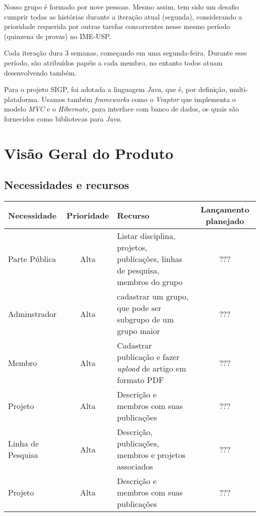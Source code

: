\documentclass[11pt, a4paper]{article}
\begin{document}
Nosso grupo é formado por nove pessoas. Mesmo assim, tem sido um desafio cumprir todas as histórias durante a iteração atual (segunda), considerando a prioridade requerida por outras tarefas concorrentes nesse mesmo período (quinzena de provas) no IME-USP. 

 Cada iteração dura 3 semanas, começando em uma segunda-feira. Durante esse período, são atribuídos papéis a cada membro, no entanto todos atuam desenvolvendo também.

Para o projeto SIGP, foi adotada a linguagem \emph{Java}, que é, por definição, multi-plataforma. Usamos também \emph{frameworks} como o \emph{Vraptor} que implementa o modelo \emph{MVC} e o \emph{Hibernate}, para interface com banco de dados, os quais são fornecidos como bibliotecas para \emph{Java}.
    
    \section{Visão Geral do Produto}
        \subsection{Necessidades e recursos}
            \begin{tabular}{| l | c | p{5cm} | c |}
                \hline
                Necessidade & Prioridade & Recurso & Lançamento planejado \\ \hline
                Parte Pública & Alta & Listar disciplina, projetos, publicações, linhas de pesquisa, membros do grupo & ???\\ \hline
                Adminstrador & Alta & cadastrar um grupo, que 
                pode ser subgrupo de um grupo maior & ???\\ \hline
                Membro & Alta & Cadastrar publicação e fazer 
                \emph{upload} de artigo em formato PDF & ???\\ \hline
                Projeto & Alta & Descrição e membros com suas 
                publicações & ???\\ \hline
                Linha de Pesquisa & Alta & Descrição, publicações, 
                membros e projetos associados & ???\\ \hline
                Projeto & Alta & Descrição e membros com suas 
                publicações & ???\\ \hline
                \hline
            \end{tabular}
                
            


    
\end{document}
